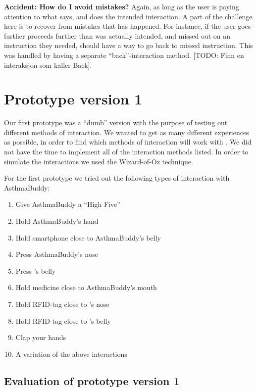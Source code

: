 \textbf{Accident: How do I avoid mistakes?}
Again, as long as the user is paying attention to what \buddy{} says, and does the intended interaction. A part of the challenge here is to recover from mistakes that has happened. For instance, if the user goes further proceeds further than was actually intended, and missed out on an instruction they needed, \buddy{} should have a way to go back to missed instruction. This was handled by having a separate ``back''-interaction method.
[TODO: Finn en interaksjon som kaller Back].   


 

\section{Prototype version 1}
\label{sec:proto1}
Our first prototype was a ``dumb'' version with the purpose of testing out different methods of interaction. We wanted to get as many different experiences as possible, in order to find which methods of interaction will work with \ab{}. We did not have the time to implement all of the interaction methods listed. In order to simulate the interactions we used the Wizard-of-Oz technique\cite{wilson1988rapid}. 

For the first prototype we tried out the following types of interaction with AsthmaBuddy:
\begin{enumerate}
	\item{Give AsthmaBuddy a ``High Five''}
	\item{Hold AsthmaBuddy's hand}
	\item{Hold smartphone close to AsthmaBuddy's belly}
	\item{Press AsthmaBuddy's nose}
	\item{Press \buddy{}'s belly}
	\item{Hold medicine close to AsthmaBuddy's mouth}
	\item{Hold RFID-tag close to \buddy{}'s nose}
	\item{Hold RFID-tag close to \buddy{}'s belly}
	\item{Clap your hands}
	\item{A variation of the above interactions}
\end{enumerate}


\subsection{Evaluation of prototype version 1}

